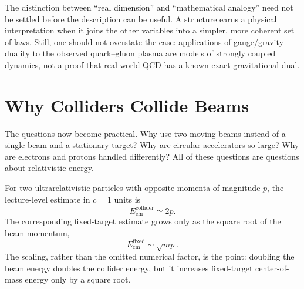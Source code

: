 The distinction between ``real dimension'' and ``mathematical analogy'' need
not be settled before the description can be useful. A structure earns a
physical interpretation when it joins the other variables into a simpler,
more coherent set of laws. Still, one should not overstate the case:
applications of gauge/gravity duality to the observed quark--gluon plasma are
models of strongly coupled dynamics, not a proof that real-world QCD has a
known exact gravitational dual.

\section{Why Colliders Collide Beams}

The questions now become practical. Why use two moving beams instead of a
single beam and a stationary target? Why are circular accelerators so large?
Why are electrons and protons handled differently? All of these questions are
questions about relativistic energy.

\begin{classroomqa}
\end{classroomqa}

For two ultrarelativistic particles with opposite momenta of magnitude \(p\),
the lecture-level estimate in \(c=1\) units is
\begin{equation}
E_{\mathrm{cm}}^{\mathrm{collider}}\simeq 2p.
\end{equation}
The corresponding fixed-target estimate grows only as the square root of the
beam momentum,
\begin{equation}
E_{\mathrm{cm}}^{\mathrm{fixed}}\sim \sqrt{mp}.
\end{equation}
The scaling, rather than the omitted numerical factor, is the point: doubling
the beam energy doubles the collider energy, but it increases fixed-target
center-of-mass energy only by a square root.

